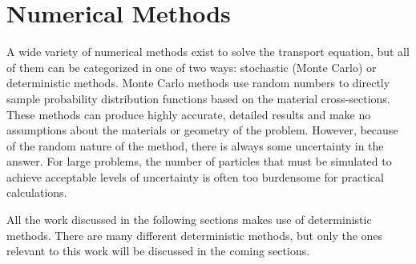 
\section{Numerical Methods}

A wide variety of numerical methods exist to solve the transport equation, but all of them can be categorized in one of two ways: stochastic (Monte Carlo) or deterministic methods.  Monte Carlo methods use random numbers to directly sample probability distribution functions based on the material cross-sections.  These methods can produce highly accurate, detailed results and make no assumptions about the materials or geometry of the problem.  However, because of the random nature of the method, there is always some uncertainty in the answer.  For large problems, the number of particles that must be simulated to achieve acceptable levels of uncertainty is often too burdensome  for practical calculations.

All the work discussed in the following sections makes use of deterministic methods.  There are many different deterministic methods, but only the ones relevant to this work will be discussed in the coming sections.

